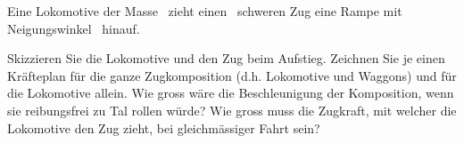 Eine Lokomotive der Masse \mLoO\ zieht einen \mZuO\ schweren Zug eine Rampe mit Neigungswinkel \wiO\ hinauf.
\begin{abcliste}
\abc Skizzieren Sie die Lokomotive und den Zug beim Aufstieg. Zeichnen Sie je einen Kräfteplan für die ganze Zugkomposition (d.h. Lokomotive und Waggons) und für die Lokomotive allein.
\abc Wie gross wäre die Beschleunigung der Komposition, wenn sie reibungsfrei zu Tal rollen würde? Wie gross muss die Zugkraft, mit welcher die Lokomotive den Zug zieht, bei gleichmässiger Fahrt sein?
\end{abcliste}
